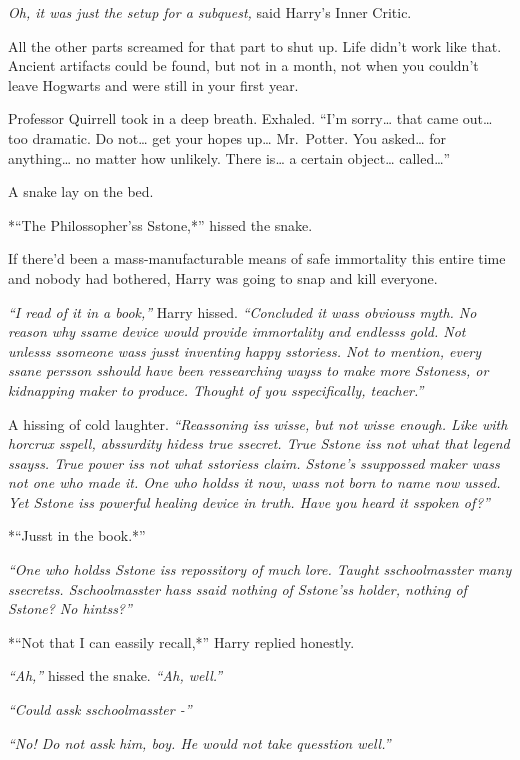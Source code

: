 \emph{Oh, it was just the setup for a subquest,} said Harry's Inner
Critic.

All the other parts screamed for that part to shut up. Life didn't work
like that. Ancient artifacts could be found, but not in a month, not
when you couldn't leave Hogwarts and were still in your first year.

Professor Quirrell took in a deep breath. Exhaled. ``I'm sorry\ldots{}
that came out\ldots{} too dramatic. Do not\ldots{} get your hopes
up\ldots{} Mr.~Potter. You asked\ldots{} for anything\ldots{} no matter
how unlikely. There is\ldots{} a certain object\ldots{} called\ldots{}''

A snake lay on the bed.

*``The Philossopher'ss Sstone,*'' hissed the snake.

If there'd been a mass-manufacturable means of safe immortality this
entire time and nobody had bothered, Harry was going to snap and kill
everyone.

\emph{``I read of it in a book,''} Harry hissed. \emph{``Concluded it
wass obviouss myth. No reason why ssame device would provide immortality
and endlesss gold. Not unlesss ssomeone wass jusst inventing happy
sstoriess. Not to mention, every ssane persson sshould have been
ressearching wayss to make more Sstoness, or kidnapping maker to
produce. Thought of you sspecifically, teacher.''}

A hissing of cold laughter. \emph{``Reassoning iss wisse, but not wisse
enough. Like with horcrux sspell, abssurdity hidess true ssecret. True
Sstone iss not what that legend ssayss. True power iss not what
sstoriess claim. Sstone's ssuppossed maker wass not one who made it. One
who holdss it now, wass not born to name now ussed. Yet Sstone iss
powerful healing device in truth. Have you heard it sspoken of?''}

*``Jusst in the book.*''

\emph{``One who holdss Sstone iss repossitory of much lore. Taught
sschoolmasster many ssecretss. Sschoolmasster hass ssaid nothing of
Sstone'ss holder, nothing of Sstone? No hintss?''}

*``Not that I can eassily recall,*'' Harry replied honestly.

\emph{``Ah,''} hissed the snake. \emph{``Ah, well.''}

\emph{``Could assk sschoolmasster -''}

\emph{``No! Do not assk him, boy. He would not take quesstion well.''}

